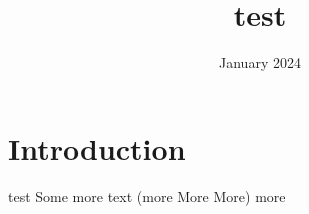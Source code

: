 \documentclass{article}
\title{test}
\author{ }
\date{January 2024}
\begin{document}
\maketitle

\section{Introduction}
test
Some more text (more More More)
more
\end{document}
